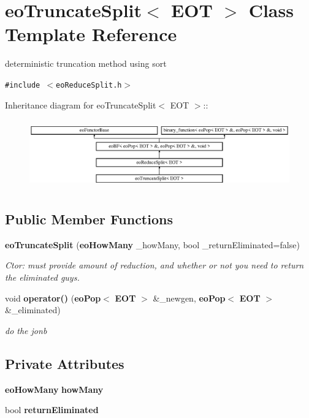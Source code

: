 \section{eo\-Truncate\-Split$<$ EOT $>$ Class Template Reference}
\label{classeo_truncate_split}
deterministic truncation method using sort  


{\tt \#include $<$eo\-Reduce\-Split.h$>$}

Inheritance diagram for eo\-Truncate\-Split$<$ EOT $>$::\begin{figure}[H]
\begin{center}
\leavevmode
\includegraphics[height=3.01075cm]{classeo_truncate_split}
\end{center}
\end{figure}
\subsection*{Public Member Functions}
\begin{CompactItemize}
\item 
{\bf eo\-Truncate\-Split} ({\bf eo\-How\-Many} \_\-how\-Many, bool \_\-return\-Eliminated=false)\label{classeo_truncate_split_a0}

\begin{CompactList}\small\item\em Ctor: must provide amount of reduction, and whether or not you need to return the eliminated guys. \item\end{CompactList}\item 
void {\bf operator()} ({\bf eo\-Pop}$<$ {\bf EOT} $>$ \&\_\-newgen, {\bf eo\-Pop}$<$ {\bf EOT} $>$ \&\_\-eliminated)\label{classeo_truncate_split_a1}

\begin{CompactList}\small\item\em do the jonb \item\end{CompactList}\end{CompactItemize}
\subsection*{Private Attributes}
\begin{CompactItemize}
\item 
{\bf eo\-How\-Many} {\bf how\-Many}\label{classeo_truncate_split_r0}

\item 
bool {\bf return\-Eliminated}\label{classeo_truncate_split_r1}

\end{CompactItemize}


